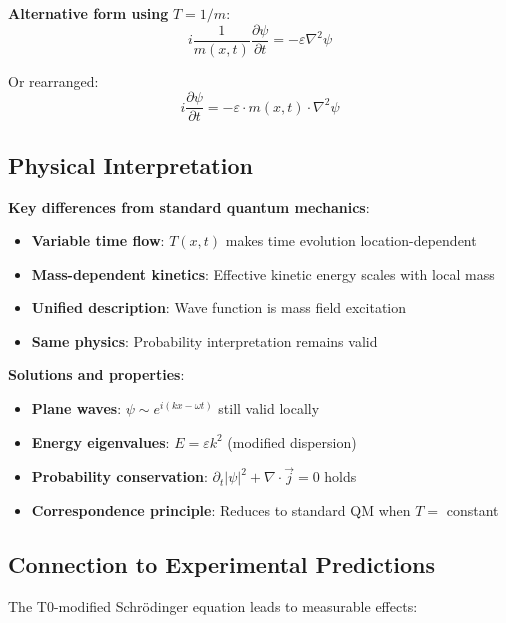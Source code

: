 	\textbf{Alternative form using} $T = 1/m$:
	\begin{equation}
		i \frac{1}{m(x,t)} \frac{\partial\psi}{\partial t} = -\varepsilon \nabla^2 \psi
		\label{eq:t0_schrodinger_mass}
	\end{equation}
	
	Or rearranged:
	\begin{equation}
		i \frac{\partial\psi}{\partial t} = -\varepsilon \cdot m(x,t) \cdot \nabla^2 \psi
		\label{eq:t0_schrodinger_rearranged}
	\end{equation}
	
	\subsection{Physical Interpretation}
	
	\textbf{Key differences from standard quantum mechanics}:
	\begin{itemize}
		\item \textbf{Variable time flow}: $T(x,t)$ makes time evolution location-dependent
		\item \textbf{Mass-dependent kinetics}: Effective kinetic energy scales with local mass
		\item \textbf{Unified description}: Wave function is mass field excitation
		\item \textbf{Same physics}: Probability interpretation remains valid
	\end{itemize}
	
	\textbf{Solutions and properties}:
	\begin{itemize}
		\item \textbf{Plane waves}: $\psi \sim e^{i(kx - \omega t)}$ still valid locally
		\item \textbf{Energy eigenvalues}: $E = \varepsilon k^2$ (modified dispersion)
		\item \textbf{Probability conservation}: $\partial_t|\psi|^2 + \nabla \cdot \vec{j} = 0$ holds
		\item \textbf{Correspondence principle}: Reduces to standard QM when $T = $ constant
	\end{itemize}
	
	\subsection{Connection to Experimental Predictions}
	
	The T0-modified Schrödinger equation leads to measurable effects:
	
